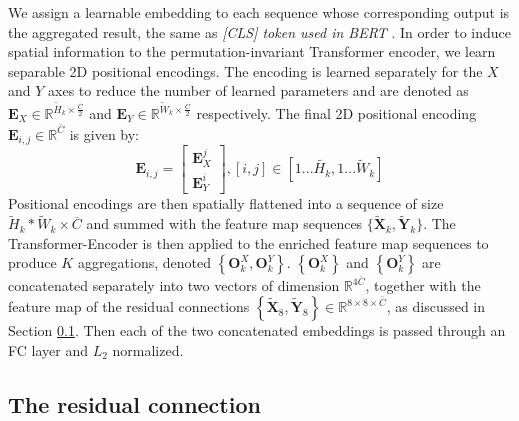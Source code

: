 \documentclass[10pt,journal]{IEEEtran}\usepackage{amsfonts}
\begin{document}
We assign a learnable embedding to each sequence whose corresponding output
is the aggregated result, the same as \emph{[CLS] token used in BERT} \cite {bert}. In order to induce spatial information to the permutation-invariant
Transformer encoder, we learn separable 2D positional encodings. The
encoding is learned separately for the $X$ and $Y$ axes to reduce the number
of learned parameters and are denoted as $\mathbf{E}_{X}\in \mathbb{R}^{\widetilde{H}_{k}\times \frac{\overline{C}}{2}}$ and $\mathbf{E}_{Y}\in
\mathbb{R}^{\widetilde{W}_{k}\times \frac{\overline{C}}{2}}$ respectively.
The final 2D positional encoding $\mathbf{E}_{i,j}\in \mathbb{R}^{\overline{C}}$ is given by:\begin{equation}
\mathbf{E}_{i,j}=\begin{bmatrix}
\mathbf{E}_{X}^{j} \\
\mathbf{E}_{Y}^{i}\end{bmatrix},\left[ i,j\right] \in \left[ 1...\widetilde{H_{k}},1...\widetilde{W}_{k}\right]  \label{eq:2d_emb}
\end{equation}Positional encodings are then spatially flattened into a sequence of size $\widetilde{H}_{k}\ast \widetilde{W}_{k}\times \overline{C}$ and summed with
the feature map sequences $\{\mathbf{\widetilde{X}}_{k},\mathbf{\widetilde{Y}}_{k}\}$. The Transformer-Encoder is then applied to the enriched feature
map sequences to produce $K$ aggregations, denoted $\left\{ \mathbf{O}_{k}^{X},\mathbf{O}_{k}^{Y}\right\} $. $\left\{ \mathbf{O}_{k}^{X}\right\} $
and $\left\{ \mathbf{O}_{k}^{Y}\right\} $ are concatenated separately into
two vectors of dimension $\mathbb{R}^{4\overline{C}}$, together with the
feature map of the residual connections $\left\{ \mathbf{\widetilde{X}}_{8},\mathbf{\widetilde{Y}}_{8}\right\} \in \mathbb{R}^{8\times 8\times \overline{C}}$, as discussed in Section \ref{subsec:residual_connection}. Then each of
the two concatenated embeddings is passed through an FC layer and $L_{2}$
normalized.

\subsection{The residual connection}

\label{subsec:residual_connection}
\end{document}
